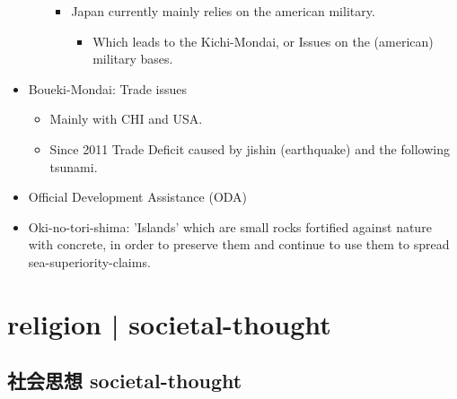 \documentclass{article}
\newcommand\tabni[1][0.2cm]{\hspace*{#1}}
\begin{document}
\begin{itemize}
\begin{itemize}
\begin{itemize}
                    \item Japan currently mainly relies on the american military.
                    \begin{itemize}
                          \item Which leads to the Kichi-Mondai, or Issues on the (american) military bases.
                    \end{itemize}
               \end{itemize}
           \end{itemize}
        \item Boueki-Mondai: Trade issues
           \begin{itemize}
               \item Mainly with CHI and USA.
               \item Since 2011 Trade Deficit caused by jishin (earthquake) and the following tsunami.
           \end{itemize}
        \item Official Development Assistance (ODA)
        \item Oki-no-tori-shima: 'Islands' which are small rocks fortified against nature with concrete, in order to preserve
        them and continue to use them to spread sea-superiority-claims.
\end{itemize}
\section{ \tabni religion |  \tabni societal-thought }
\subsection{社会思想 \tabni societal-thought}
\end{document}

